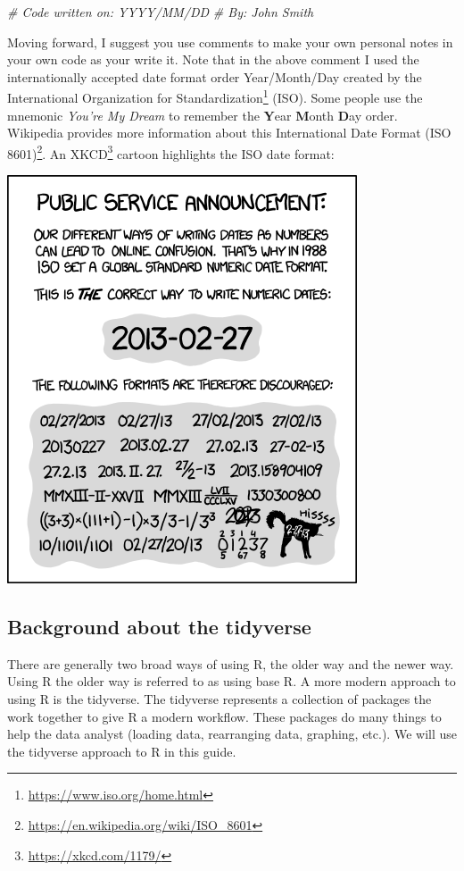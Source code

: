 \documentclass[
]{krantz}
\makeatletter
\newenvironment{Shaded}{\begin{snugshade}}{\end{snugshade}}
\newcommand{\CommentTok}[1]{\textcolor[rgb]{0.37,0.37,0.37}{\textit{#1}}}
\renewcommand{\href}[2]{#2\footnote{\url{#1}}}
\newenvironment{kframe}{%
\medskip{}
\setlength{\fboxsep}{.8em}
 \def\at@end@of@kframe{}%
 \ifinner\ifhmode%
  \def\at@end@of@kframe{\end{minipage}}%
  \begin{minipage}{\columnwidth}%
 \fi\fi%
 \def\FrameCommand##1{\hskip\@totalleftmargin \hskip-\fboxsep
 \colorbox{shadecolor}{##1}\hskip-\fboxsep
     \hskip-\linewidth \hskip-\@totalleftmargin \hskip\columnwidth}%
 \MakeFramed {\advance\hsize-\width
   \@totalleftmargin\z@ \linewidth\hsize
   \@setminipage}}%
 {\par\unskip\endMakeFramed%
 \at@end@of@kframe}
\renewenvironment{Shaded}{\begin{kframe}}{\end{kframe}}
\makeatother
\begin{document}
\begin{Shaded}
\begin{Highlighting}[]
\CommentTok{\# Code written on: YYYY/MM/DD }
\CommentTok{\# By: John Smith}
\end{Highlighting}
\end{Shaded}

Moving forward, I suggest you use comments to make your own personal notes in your own code as your write it. Note that in the above comment I used the internationally accepted date format order Year/Month/Day created by the \href{https://www.iso.org/home.html}{International Organization for Standardization} (ISO). Some people use the mnemonic \emph{You're My Dream} to remember the \textbf{Y}ear \textbf{M}onth \textbf{D}ay order. Wikipedia provides more information about this \href{https://en.wikipedia.org/wiki/ISO_8601}{International Date Format (ISO 8601)}. An \href{https://xkcd.com/1179/}{XKCD} cartoon highlights the ISO date format:

\includegraphics[width=0.4\linewidth]{ch_introduction/images/iso8601}

\hypertarget{background-about-the-tidyverse}{%
\subsection{Background about the tidyverse}\label{background-about-the-tidyverse}}

There are generally two broad ways of using R, the older way and the newer way. Using R the older way is referred to as using base R. A more modern approach to using R is the tidyverse. The tidyverse represents a collection of packages the work together to give R a modern workflow. These packages do many things to help the data analyst (loading data, rearranging data, graphing, etc.). We will use the tidyverse approach to R in this guide.
\end{document}
